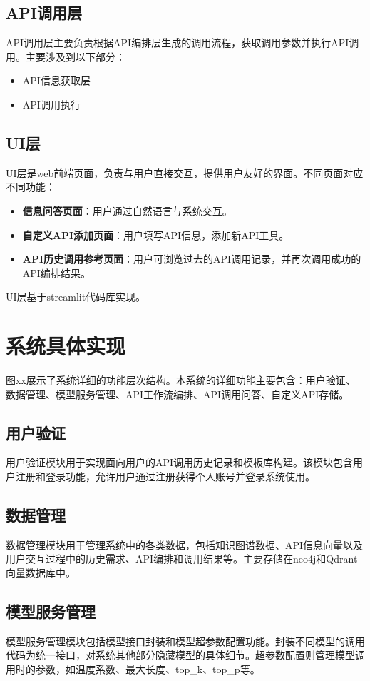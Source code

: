 \subsection{API调用层}
API调用层主要负责根据API编排层生成的调用流程，获取调用参数并执行API调用。主要涉及到以下部分：
\begin{itemize}
    \item API信息获取层
    \item API调用执行
\end{itemize}

\subsection{UI层}
UI层是web前端页面，负责与用户直接交互，提供用户友好的界面。不同页面对应不同功能：
\begin{itemize}
    \item \textbf{信息问答页面}：用户通过自然语言与系统交互。
    \item \textbf{自定义API添加页面}：用户填写API信息，添加新API工具。
    \item \textbf{API历史调用参考页面}：用户可浏览过去的API调用记录，并再次调用成功的API编排结果。
\end{itemize}
UI层基于streamlit代码库实现。

\section{系统具体实现}
图xx展示了系统详细的功能层次结构。本系统的详细功能主要包含：用户验证、数据管理、模型服务管理、API工作流编排、API调用问答、自定义API存储。

\subsection{用户验证}
用户验证模块用于实现面向用户的API调用历史记录和模板库构建。该模块包含用户注册和登录功能，允许用户通过注册获得个人账号并登录系统使用。

\subsection{数据管理}
数据管理模块用于管理系统中的各类数据，包括知识图谱数据、API信息向量以及用户交互过程中的历史需求、API编排和调用结果等。主要存储在neo4j和Qdrant向量数据库中。

\subsection{模型服务管理}
模型服务管理模块包括模型接口封装和模型超参数配置功能。封装不同模型的调用代码为统一接口，对系统其他部分隐藏模型的具体细节。超参数配置则管理模型调用时的参数，如温度系数、最大长度、top\_k、top\_p等。

